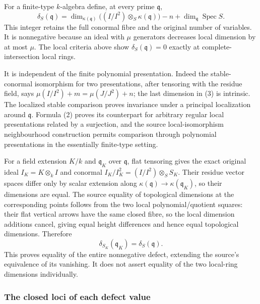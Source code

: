 For a finite-type \(k\)-algebra define, at every prime \(\mathfrak q\), \[
\delta_S(\mathfrak q)=
\dim_{\kappa(\mathfrak q)}\big((I/I^2)\otimes_S\kappa(\mathfrak q)\big)
-n+\dim_{\mathfrak q}\operatorname{Spec}S.\tag{3}
\] This integer retains the full conormal fibre and the original number of variables. It is nonnegative because an ideal with \(\mu\) generators decreases local dimension by at most \(\mu\). The local criteria above show \(\delta_S(\mathfrak q)=0\) exactly at complete-intersection local rings.

It is independent of the finite polynomial presentation. Indeed the stable-conormal isomorphism for two presentations, after tensoring with the residue field, says \(\mu(I/I^2)+m=\mu(J/J^2)+n\); the last dimension in (3) is intrinsic. The localized stable comparison proves invariance under a principal localization around \(\mathfrak q\). Formula (2) proves its counterpart for arbitrary regular local presentations related by a surjection, and the source local-isomorphism neighbourhood construction permits comparison through polynomial presentations in the essentially finite-type setting.

For a field extension \(K/k\) and \(\mathfrak q_K\) over \(\mathfrak q\), flat tensoring gives the exact original ideal \(I_K=K\otimes_k I\) and conormal \(I_K/I_K^2=(I/I^2)\otimes_S S_K\). Their residue vector spaces differ only by scalar extension along \(\kappa(\mathfrak q)\to\kappa(\mathfrak q_K)\), so their dimensions are equal. The source equality of topological dimensions at the corresponding points follows from the two local polynomial/quotient squares: their flat vertical arrows have the same closed fibre, so the local dimension additions cancel, giving equal height differences and hence equal topological dimensions. Therefore \[
\delta_{S_K}(\mathfrak q_K)=\delta_S(\mathfrak q).\tag{4}
\] This proves equality of the entire nonnegative defect, extending the source's equivalence of its vanishing. It does not assert equality of the two local-ring dimensions individually.

\subsubsection{The closed loci of each defect value}\label{algebra-proof-045-the-closed-loci-of-each-defect-value}

